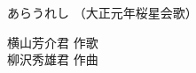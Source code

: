 \documentclass[10pt,b5j]{tarticle} %
\begin{document}
\begin{minipage}[c]{0.7\hsize} %
    \begin{center}
        {\LARGE
            あらうれし %
        }
        {\small 
            （大正元年桜星会歌） %
        }
    \end{center}
\end{minipage}
\begin{minipage}[c]{0.3\hsize} %
    \begin{flushright} %
        横山芳介君 作歌\\柳沢秀雄君 作曲 %
    \end{flushright}
\end{minipage}
\end{document}
